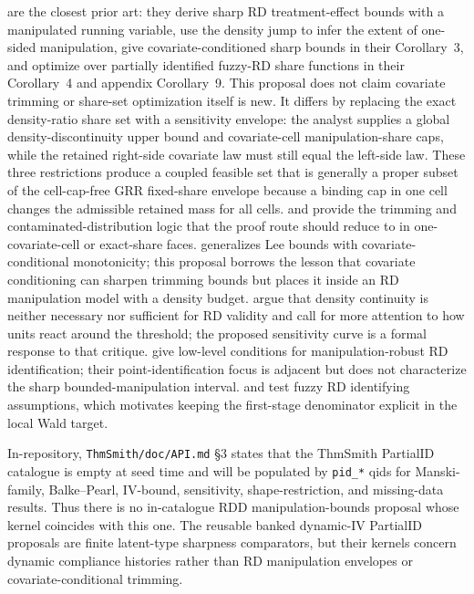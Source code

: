 \documentclass[11pt]{article}
\theoremstyle{definition}
\theoremstyle{plain}
\theoremstyle{remark}
\begin{document}
\citet{GerardRokkanenRothe2020} are the closest prior art: they derive sharp RD treatment-effect
bounds with a manipulated running variable, use the density jump to infer the extent of
one-sided manipulation, give covariate-conditioned sharp bounds in their Corollary~3, and
optimize over partially identified fuzzy-RD share functions in their Corollary~4 and
appendix Corollary~9.  This proposal does not claim covariate trimming or share-set
optimization itself is new.  It differs by replacing the exact density-ratio share set with
a sensitivity envelope: the analyst supplies a global density-discontinuity upper bound
and covariate-cell manipulation-share caps, while the retained right-side covariate law must
still equal the left-side law.  These three restrictions produce a coupled feasible set
that is generally a proper subset of the cell-cap-free GRR fixed-share envelope because a
binding cap in one cell changes the admissible retained mass for all cells.  \citet{Lee2009}
and \citet{HorowitzManski1995} provide the trimming and contaminated-distribution logic that
the proof route should reduce to in one-covariate-cell or exact-share faces.  \citet{Semenova2025}
generalizes Lee bounds with covariate-conditional monotonicity; this proposal borrows the
lesson that covariate conditioning can sharpen trimming bounds but places it inside an RD
manipulation model with a density budget.  \citet{ChoiLee2023} argue that density continuity
is neither necessary nor sufficient for RD validity and call for more attention to how units
react around the threshold; the proposed sensitivity curve is a formal response to that
critique.  \citet{IshiharaSawada2024} give low-level conditions for manipulation-robust RD
identification; their point-identification focus is adjacent but does not characterize the
sharp bounded-manipulation interval.  \citet{AraiHsuKitagawaMourifieWan2022} and
\citet{HsuShiuWan2024} test fuzzy RD identifying assumptions, which motivates keeping the
first-stage denominator explicit in the local Wald target.

In-repository, \texttt{ThmSmith/doc/API.md} \S3 states that the ThmSmith PartialID catalogue
is empty at seed time and will be populated by \texttt{pid\_*} qids for Manski-family,
Balke--Pearl, IV-bound, sensitivity, shape-restriction, and missing-data results.  Thus
there is no in-catalogue RDD manipulation-bounds proposal whose kernel coincides with this
one.  The reusable banked dynamic-IV PartialID proposals are finite latent-type sharpness
comparators, but their kernels concern dynamic compliance histories rather than RD
manipulation envelopes or covariate-conditional trimming.
\end{document}
